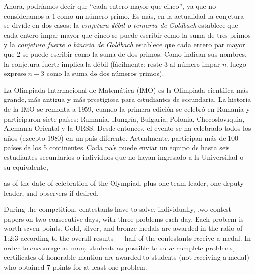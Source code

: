 
Ahora, podríamos decir que ``cada entero mayor que cinco'', ya que no consideramos a 1 como un número primo. Es más, en la actualidad la conjetura se divide en dos casos: la \emph{conjetura débil o ternaria de Goldbach} establece que cada entero impar mayor que cinco se puede escribir como la suma de tres primos y la \emph{conjetura fuerte o binaria de Goldbach} establece que cada entero par mayor que 2 se puede escribir como la suma de dos primos. Como indican sus nombres, la conjetura fuerte implica la débil (fácilmente: reste 3 al número impar $n$, luego exprese $n-3$ como la suma de dos números primos).

La Olimpiada Internacional de Matemática (IMO) es la Olimpiada científica más grande, más antigua y más prestigiosa para estudiantes de secundaria. La historia de la IMO se remonta a 1959, cuando la primera edición se celebró en Rumanía y participaron siete países: Rumanía, Hungría, Bulgaria, Polonia, Checoslovaquia, Alemania Oriental y la URSS. Desde entonces, el evento se ha celebrado todos los años (excepto 1980) en un país diferente. Actualmente, participan más de 100 países de los 5 continentes. Cada país puede enviar un equipo de hasta seis estudiantes secundarios o individuos que no hayan ingresado a la Universidad o su equivalente,

as of the date of celebration of the Olympiad, plus one team leader, one deputy leader, and observers if desired.

During the competition, contestants have to solve, individually, two contest papers on two consecutive days, with three problems each day. Each problem is worth seven points. Gold, silver, and bronze medals are awarded in the ratio of 1:2:3 according to the overall results — half of the contestants receive a medal. In order to encourage as many students as possible to solve complete problems, certificates of honorable mention are awarded to students (not receiving a medal) who obtained 7 points for at least one problem.

\begin{figure}[H]
	\centering
	\def\svgwidth{7cm}
		
\end{figure}

